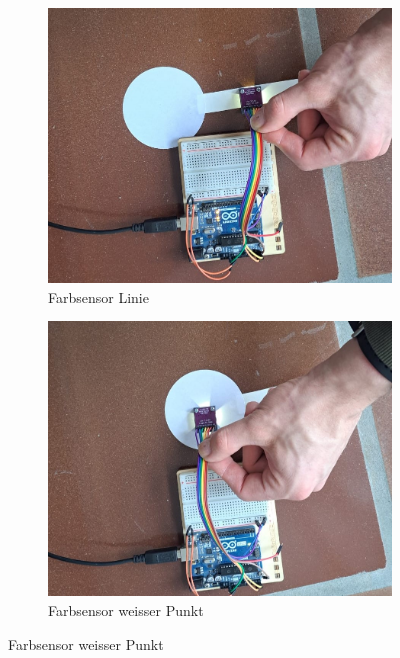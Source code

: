 \documentclass[../main.tex]{subfiles}
\begin{document}
\begin{figure}[H]
    \centering
    \begin{subfigure}{0.3\textwidth} %
        \centering
        \includegraphics[width=\linewidth]{img/sensortest/Farbsensor_Linie.jpg}
        \caption{Farbsensor Linie}
        \label{fig:FarbsensorLinie}
    \end{subfigure}
    \begin{subfigure}{0.3\textwidth}
        \centering
        \includegraphics[width=\linewidth]{img/sensortest/Farbsensor_WeisserPunkt.jpg}
        \caption{Farbsensor weisser Punkt}
        \label{fig:FarbsensorWeisserPunkt}
    \end{subfigure}
    

\end{figure}
\end{document}
